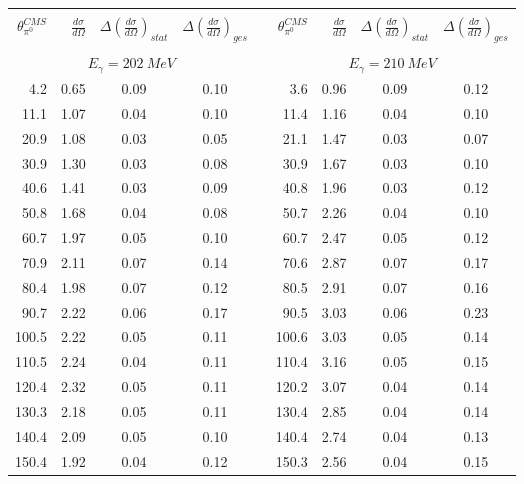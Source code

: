 \begin{table}[htbp] 
\begin{center} 
\begin{tabular}{|r|r|c|c|l|r|r|c|c|} 

\cline{1-4}
\cline{6-9} 
& & & & & & & &\\ 
$\theta_{\pi^0}^{CMS}$ & 
$\displaystyle\frac{d\sigma}{d\Omega}$ & 
${\Delta}\left( \frac{d\sigma}{d\Omega}\right)_{stat}$ & 
${\Delta}\left( \frac{d\sigma}{d\Omega}\right)_{ges}$ & & 
$\theta_{\pi^0}^{CMS}$ & 
$\displaystyle\frac{d\sigma}{d\Omega}$ & 
${\Delta}\left( \frac{d\sigma}{d\Omega}\right)_{stat}$ & 
${\Delta}\left( \frac{d\sigma}{d\Omega}\right)_{ges}$ \\ 
& & & & & & & & \\ 
\cline{1-4} 
\cline{6-9} 
\multicolumn{4}{|c|}{ $E_{\gamma}=202~MeV$} & & 
\multicolumn{4}{c|}{ $E_{\gamma}=210~MeV$} \\ 
\cline{1-4} 
\cline{6-9} 
  4.2 &  0.65 &  0.09 &  0.10 & &   3.6 &  0.96 &  0.09 &  0.12 \\ 
 11.1 &  1.07 &  0.04 &  0.10 & &  11.4 &  1.16 &  0.04 &  0.10 \\ 
 20.9 &  1.08 &  0.03 &  0.05 & &  21.1 &  1.47 &  0.03 &  0.07 \\ 
 30.9 &  1.30 &  0.03 &  0.08 & &  30.9 &  1.67 &  0.03 &  0.10 \\ 
 40.6 &  1.41 &  0.03 &  0.09 & &  40.8 &  1.96 &  0.03 &  0.12 \\ 
 50.8 &  1.68 &  0.04 &  0.08 & &  50.7 &  2.26 &  0.04 &  0.10 \\ 
 60.7 &  1.97 &  0.05 &  0.10 & &  60.7 &  2.47 &  0.05 &  0.12 \\ 
 70.9 &  2.11 &  0.07 &  0.14 & &  70.6 &  2.87 &  0.07 &  0.17 \\ 
 80.4 &  1.98 &  0.07 &  0.12 & &  80.5 &  2.91 &  0.07 &  0.16 \\ 
 90.7 &  2.22 &  0.06 &  0.17 & &  90.5 &  3.03 &  0.06 &  0.23 \\ 
100.5 &  2.22 &  0.05 &  0.11 & & 100.6 &  3.03 &  0.05 &  0.14 \\ 
110.5 &  2.24 &  0.04 &  0.11 & & 110.4 &  3.16 &  0.05 &  0.15 \\ 
120.4 &  2.32 &  0.05 &  0.11 & & 120.2 &  3.07 &  0.04 &  0.14 \\ 
130.3 &  2.18 &  0.05 &  0.11 & & 130.4 &  2.85 &  0.04 &  0.14 \\ 
140.4 &  2.09 &  0.05 &  0.10 & & 140.4 &  2.74 &  0.04 &  0.13 \\ 
150.4 &  1.92 &  0.04 &  0.12 & & 150.3 &  2.56 &  0.04 &  0.15 \\ 

\end{tabular}
\end{center}
\end{table}
